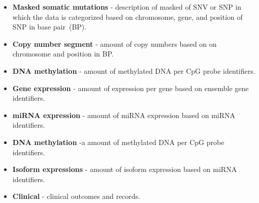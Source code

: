 \begin{itemize}[noitemsep]
    \item  \textbf{Masked somatic mutations} - description of masked of SNV or SNP in which the data is categorized based on chromosome, gene, and position of SNP in base pair~(BP). 
    \item \textbf{Copy number segment} - amount of copy numbers based on on chromosome and position in BP. 
    \item \textbf{DNA methylation} - amount of methylated DNA per CpG probe identifiers. 
    \item \textbf{Gene expression} - amount of expression per gene based on ensemble gene identifiers. 
    \item \textbf{miRNA expression} - amount of miRNA expression based on miRNA identifiers. 
    \item \textbf{DNA methylation} -a amount of methylated DNA per CpG probe identifiers. 
    \item \textbf{Isoform expressions} - amount of isoform expression based on miRNA identifiers. 
    \item \textbf{Clinical} - clinical outcomes and records. 
\end{itemize}

